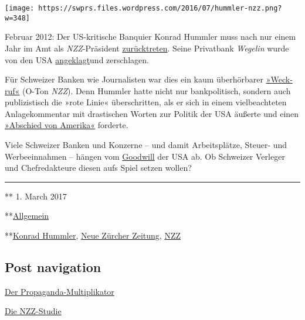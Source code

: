 \texttt{[image: https://swprs.files.wordpress.com/2016/07/hummler-nzz.png?w=348]}

Februar 2012: Der US-kritische Banquier Konrad Hummler muss nach nur
einem Jahr im Amt als \emph{NZZ}-Präsi­dent
\href{https://www.tagesanzeiger.ch/wirtschaft/unternehmen-und-konjunktur/Konrad-Hummler-gibt-NZZVRPraesidium-ab/story/25627682}{zurück­treten}.
Seine Privatbank \emph{Wegelin} wurde von den USA
\href{https://www.tagesanzeiger.ch/wirtschaft/unternehmen-und-konjunktur/USA-erhoehen-mit-WegelinKlage-den-Druck/story/25658973}{an­ge­klagt}und
zerschlagen.

Für Schweizer Banken wie Journalisten war dies ein kaum über­hör­ba­rer
\href{http://www.nzz.ch/ein-weckruf-fuer-die-schweiz-1.14608280}{»Weck­ruf«}
(O-Ton \emph{NZZ}). Denn Hummler hatte nicht nur bank­politisch, sondern
auch publi­zistisch die »rote Linie« über­schritten, als er sich in
einem viel­beachteten An­la­ge­kom­men­tar mit dras­ti­schen Worten zur
Po­li­tik der USA äußerte und einen
\href{https://swprs.files.wordpress.com/2016/03/usa_wegelin_kommentar_2009.pdf}{»Abschied
von Amerika«} forderte.

Viele Schwei­zer Banken und Konzerne -- und da­mit Ar­beits­plätze,
Steuer- und Werbe­ein­nah­men -- hän­gen vom
\href{http://www.finews.ch/news/finanzplatz/21359-us-steuerstreit-kategorie-2-kategorie-1-lombard-odier-julius-b\%C3\%A4r-department-of-justice}{Good­will}
der USA ab. Ob Schweizer Ver­le­ger und Chef­re­dak­teure diesen aufs
Spiel setzen wollen?

\begin{center}\rule{0.5\linewidth}{\linethickness}\end{center}

** 1. March 2017

**\href{https://swprs.org/category/allgemein/}{Allgemein}

**\href{https://swprs.org/tag/konrad-hummler/}{Konrad Hummler},
\href{https://swprs.org/tag/neue-zuercher-zeitung/}{Neue Zürcher
Zeitung}, \href{https://swprs.org/tag/nzz/}{NZZ}

\hypertarget{post-navigation}{%
\subsection{Post navigation}\label{post-navigation}}

\href{https://swprs.org/2017/03/01/propaganda-multiplikator/}{Der
Propaganda-Multiplikator}

\href{https://swprs.org/2017/03/01/die-nzz-studie/}{Die NZZ-Studie}

